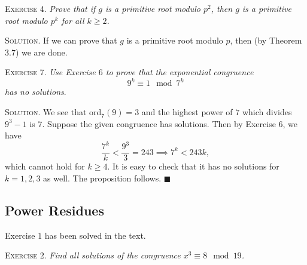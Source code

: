 \documentclass[11pt, leqno]{article}
\newcommand{\done}{\ensuremath{\blacksquare}}
\begin{document}
\textsc{Exercise 4}. \emph{Prove that if $g$ is a primitive root modulo $p^2$, then $g$ is a primitive root modulo $p^k$ for all $k\geq 2$.}

\textsc{Solution}. If we can prove that $g$ is a primitive root modulo $p$, then (by Theorem $3.7$) we are done.

\textsc{Exercise 7}. \emph{Use Exercise $6$ to prove that the exponential congruence 
\begin{displaymath}
9^k \equiv 1 \mod 7^k
\end{displaymath}
has no solutions}.

\textsc{Solution.} We see that ord$_7(9) = 3$ and the highest power of $7$ which divides $9^3-1$ is $7$. Suppose the given congruence has solutions. Then by Exercise $6$, we have 
\begin{displaymath}
\frac{7^k}{k} < \frac{9^3}{3} = 243 \implies 7^k < 243k,
\end{displaymath}
which cannot hold for $k\geq 4$. It is easy to check that it has no solutions for $k=1,2,3$ as well. The proposition follows. \done

\subsection{Power Residues}

%


Exercise $1$ has been solved in the text.

\textsc{Exercise 2}. \emph{Find all solutions of the congruence $x^3\equiv 8 \mod 19$.}
\end{document}
